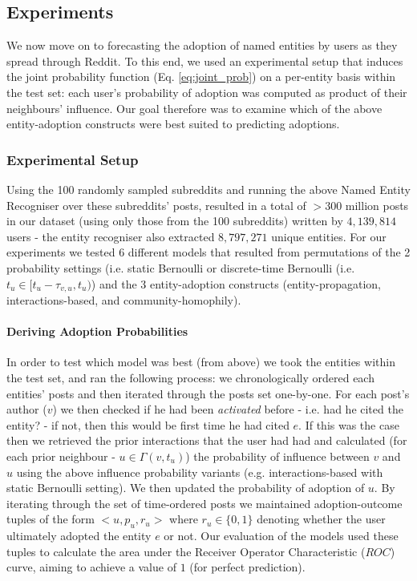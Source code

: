 \documentclass[review]{elsarticle}
\begin{document}
\subsection{Experiments}
We now move on to forecasting the adoption of named entities by users as they spread through Reddit.
To this end, we used an experimental setup that induces the joint probability function (Eq. \ref{eq:joint_prob}) on a per-entity basis within the test set: each user's probability of adoption was computed as product of their neighbours' influence.
Our goal therefore was to examine which of the above entity-adoption constructs were best suited to predicting adoptions.

\subsubsection{Experimental Setup}
Using the 100 randomly sampled subreddits and running the above Named Entity Recogniser over these subreddits' posts, resulted in a total of $>300$ million posts in our dataset (using only those from the 100 subreddits) written by $4,139,814$ users - the entity recogniser also extracted $8,797,271$ unique entities.
For our experiments we tested 6 different models that resulted from permutations of the 2 probability settings (i.e. static Bernoulli or discrete-time Bernoulli (i.e. $t_u \in [t_u - \tau_{v,u}, t_u)$) and the 3 entity-adoption constructs (entity-propagation, interactions-based, and community-homophily).

\paragraph{Deriving Adoption Probabilities}
In order to test which model was best (from above) we took the entities within the test set, and ran the following process: we chronologically ordered each entities' posts and then iterated through the posts set one-by-one.
For each post's author ($v$) we then checked if he had been \emph{activated} before - i.e. had he cited the entity? - if not, then this would be first time he had cited $e$.
If this was the case then we retrieved the prior interactions that the user had had and calculated (for each prior neighbour - $u \in \Gamma(v, t_u)$) the probability of influence between $v$ and $u$ using the above influence probability variants (e.g. interactions-based with static Bernoulli setting).
We then updated the probability of adoption of $u$.
By iterating through the set of time-ordered posts we maintained adoption-outcome tuples of the form $<u, p_u, r_u>$ where $r_u \in \{0,1\}$ denoting whether the user ultimately adopted the entity $e$ or not.
Our evaluation of the models used these tuples to calculate the area under the Receiver Operator Characteristic ($ROC$) curve, aiming to achieve a value of $1$ (for perfect prediction).
\end{document}
